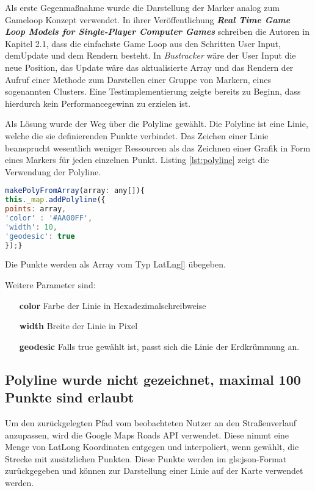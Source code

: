 Als erste Gegenmaßnahme wurde die Darstellung der Marker analog zum Gameloop Konzept verwendet. In ihrer Veröffentlichung  \emph{\textbf{Real Time Game Loop Models for Single-Player Computer Games}} \cite{valente2005real} schreiben die Autoren in Kapitel 2.1, dass die einfachste Game Loop aus den Schritten \glqq User Input\grqq{}, dem\glqq Update\grqq{} und dem \glqq Rendern\grqq{} besteht. In \emph{Bustracker} wäre der User Input die neue Position, das Update wäre das aktualisierte Array und das Rendern der Aufruf einer Methode zum Darstellen einer Gruppe von Markern, eines sogenannten Clusters.
Eine Testimplementierung zeigte bereits zu Beginn, dass hierdurch kein Performancegewinn zu erzielen ist.  

Als Lösung wurde der Weg über die Polyline gewählt. Die Polyline ist eine Linie, welche die sie definierenden Punkte verbindet. Das Zeichen einer Linie beansprucht wesentlich weniger Ressourcen als das Zeichnen einer Grafik in Form eines Markers für jeden einzelnen Punkt. Listing \ref{lst:polyline} zeigt die Verwendung der Polyline.
\vspace{12px}
\begin{lstlisting}[language= JavaScript, caption= Zeichnen einer Polyline auf einer Google Map, label=lst:polyline]
makePolyFromArray(array: any[]){
this._map.addPolyline({
points: array,
'color' : '#AA00FF',
'width': 10,
'geodesic': true
});}
\end{lstlisting}
Die Punkte werden als Array vom Typ LatLng[] übegeben. 

Weitere Parameter sind: 
\begin{itemize}
\item[\textbf{color}]
Farbe der Linie in Hexadezimalschreibweise
\item[\textbf{width}]
Breite der Linie in Pixel
\item[\textbf{geodesic}]
Falls true gewählt ist, passt sich die Linie der Erdkrümmung an.
\end{itemize}

\subsection{Polyline wurde nicht gezeichnet, maximal 100 Punkte sind erlaubt}
Um den zurückgelegten Pfad vom beobachteten Nutzer an den Straßenverlauf anzupassen, wird die Google Maps Roads API \cite{RoadsAPIDoc} verwendet. Diese nimmt eine Menge von LatLong Koordinaten entgegen und interpoliert, wenn gewählt, die Strecke mit zusätzlichen Punkten. Diese Punkte werden im \gls{gls:json}-Format zurückgegeben und können zur Darstellung einer Linie auf der Karte verwendet werden.

